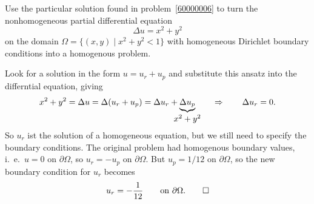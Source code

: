 Use the particular solution found in problem~\ref{60000006}
to turn the nonhomogeneous partial differential equation
\[
\Delta u = x^2 + y^2
\]
on the domain $\Omega=\{(x,y)\mid x^2+y^2<1\}$ with homogeneous
Dirichlet boundary conditions into a homogenous problem.

\begin{loesung}
Look for a solution in the form $u=u_r+u_p$ and substitute this ansatz
into the differntial equation, giving
\[
x^2+y^2
=
\Delta u 
=
\Delta (u_r+u_p)
=
\Delta u_r + \underbrace{\Delta u_p}_{\displaystyle \clap{$x^2+y^2$}}
\qquad\Rightarrow\qquad
\Delta u_r = 0.
\]
So $u_r$ ist the solution of a homogeneous equation, but we still need
to specify the boundary conditions.
The original problem had homogenous boundary values, i.~e.~$u = 0$
on $\partial\Omega$, so $u_r = -u_p$ on $\partial\Omega$.
But $u_p = 1/12$ on $\partial\Omega$, so the new boundary condition
for $u_r$ becomes
\[
u_r = -\frac1{12}
\qquad\text{on $\partial\Omega$}.
\qedhere
\]
\end{loesung}


